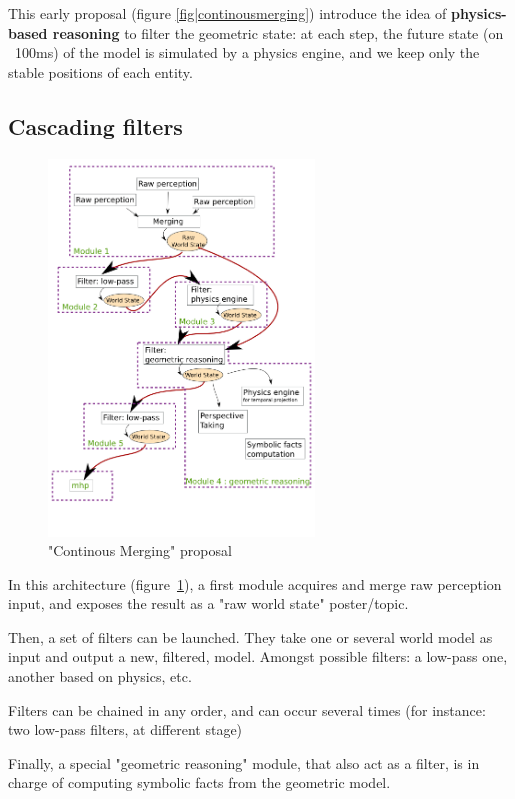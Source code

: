 \documentclass[a4paper]{article}
\begin{document}
This early proposal (figure \ref{fig|continousmerging}) introduce the idea of \textbf{physics-based reasoning} to
filter the geometric state: at each step, the future state (on ~100ms) of the
model is simulated by a physics engine, and we keep only the stable positions
of each entity.

\FloatBarrier

\subsection{Cascading filters}

\begin{figure}[!h]
    \centering
    \includegraphics[height=10cm]{images/spark_archi1.png}
    \caption{"Continous Merging" proposal}
    \label{fig|cascading}
\end{figure}


In this architecture (figure~\ref{fig|cascading}), a first module acquires and merge raw perception input,
and exposes the result as a "raw world state" poster/topic.

Then, a set of filters can be launched. They take one or several world model as
input and output a new, filtered, model. Amongst possible filters: a low-pass
one, another based on physics, etc.

Filters can be chained in any order, and can occur several times (for instance:
two low-pass filters, at different stage)

Finally, a special "geometric reasoning" module, that also act as a filter, is
in charge of computing symbolic facts from the geometric model.
\end{document}

